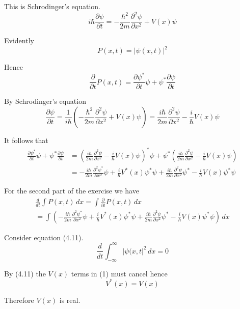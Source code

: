 


\bigskip
This is Schrodinger's equation.
\begin{equation*}
i\hbar\frac{\partial\psi}{\partial t}
=-\frac{\hbar^2}{2m}\frac{\partial^2\psi}{\partial x^2}+V(x)\psi
\tag{4.1}
\end{equation*}

Evidently
\begin{equation*}
P(x,t)=|\psi(x,t)|^2
\end{equation*}

Hence
\begin{equation*}
\frac{\partial}{\partial t}P(x,t)
=\frac{\partial\psi^*}{\partial t}\psi
+\psi^*\frac{\partial\psi}{\partial t}
\end{equation*}

By Schrodinger's equation
\begin{equation*}
\frac{\partial\psi}{\partial t}
=\frac{1}{i\hbar}\left(
-\frac{\hbar^2}{2m}\frac{\partial^2\psi}{\partial x^2}+V(x)\psi
\right)
=\frac{i\hbar}{2m}\frac{\partial^2\psi}{\partial x^2}
-\frac{i}{\hbar}V(x)\psi
\end{equation*}

It follows that
\begin{align*}
\frac{\partial\psi^*}{\partial t}\psi
+\psi^*\frac{\partial\psi}{\partial t}
&=\left(\frac{i\hbar}{2m}\frac{\partial^2\psi}{\partial x^2}
-\frac{i}{\hbar}V(x)\psi\right)^*\psi
+\psi^*\left(\frac{i\hbar}{2m}\frac{\partial^2\psi}{\partial x^2}
-\frac{i}{\hbar}V(x)\psi\right)
\\
&=-\frac{i\hbar}{2m}\frac{\partial^2\psi^*}{\partial x^2}\psi
+\frac{i}{\hbar}V^*(x)\psi^*\psi
+\frac{i\hbar}{2m}\frac{\partial^2\psi}{\partial x^2}\psi^*
-\frac{i}{\hbar}V(x)\psi^*\psi
\end{align*}

For the second part of the exercise we have
\begin{multline*}
\frac{d}{dt}\int P(x,t)\,dx
=\int\frac{\partial}{\partial t}P(x,t)\,dx
\\
{}=\int
\left(
-\frac{i\hbar}{2m}\frac{\partial^2\psi^*}{\partial x^2}\psi
+\frac{i}{\hbar}V^*(x)\psi^*\psi
+\frac{i\hbar}{2m}\frac{\partial^2\psi}{\partial x^2}\psi^*
-\frac{i}{\hbar}V(x)\psi^*\psi
\right)\,dx\tag{1}
\end{multline*}

Consider equation (4.11).
\begin{equation*}
\frac{d}{dt}\int_{-\infty}^\infty|\psi(x,t|^2\,dx=0
\tag{4.11}
\end{equation*}

By (4.11) the $V(x)$ terms in (1) must cancel hence
\begin{equation*}
V^*(x)=V(x)
\end{equation*}

Therefore $V(x)$ is real.


